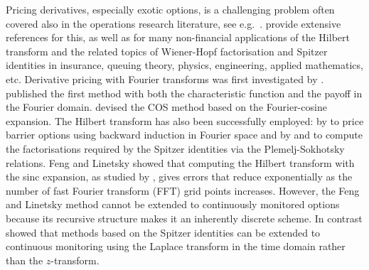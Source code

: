 \documentclass[11pt,a4paper]{article}
\begin{document}
Pricing derivatives, especially exotic options, is a challenging problem often covered also in the operations research literature, see e.g.\ \cite{kou2008}. \cite{Fusai2016} provide extensive references for this, as well as for many non-financial applications of the Hilbert transform and the related topics of Wiener-Hopf factorisation and Spitzer identities in insurance, queuing theory, physics, engineering, applied mathematics, etc. Derivative pricing with Fourier transforms was first investigated by \cite{heston1993closed}. \cite{Carr1999} published the first method with both the characteristic function and the payoff in the Fourier domain. \cite{fang2008novel,Fang2009pricing} devised the COS method based on the Fourier-cosine expansion. The Hilbert transform \citep{King2009} has also been successfully employed: by \cite{Feng2008} to price barrier options using backward induction in Fourier space and by \cite{marazzina2012pricing} and \cite{Fusai2016} to compute the factorisations required by the Spitzer identities via the Plemelj-Sokhotsky relations. Feng and Linetsky showed that computing the Hilbert transform with the sinc expansion, as studied by \cite{Stenger1993,Stenger2011}, gives errors that reduce exponentially as the number of fast Fourier transform (FFT) grid points increases. However, the Feng and Linetsky method cannot be extended to continuously monitored options because its recursive structure makes it an inherently discrete scheme. %
In contrast \cite{Green2010} showed that methods based on the Spitzer identities can be extended to continuous monitoring using the Laplace transform in the time domain rather than the $z$-transform.

\end{document}
